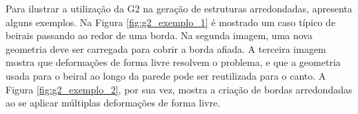 \begin{figure}[h!]
	\centering
	\captionsetup{width=15cm}
	{}	
\end{figure}

\newpage

Para ilustrar a utilização da \gls{G2} na geração de estruturas arredondadas,  apresenta alguns exemplos. Na Figura \ref{fig:g2_exemplo_1} é mostrado um caso típico de beirais passando ao redor de uma borda. Na segunda imagem, uma nova geometria deve ser carregada para cobrir a borda afiada. A terceira imagem mostra que deformações de forma livre resolvem o problema, e que a geometria usada para o beiral ao longo da parede pode ser reutilizada para o canto. A Figura \ref{fig:g2_exemplo_2}, por sua vez, mostra a criação de bordas arredondadas ao se aplicar múltiplas deformações de forma livre.

\begin{figure}[h!]
	\centering
	\captionsetup{width=15cm}
	{}	
\end{figure}

